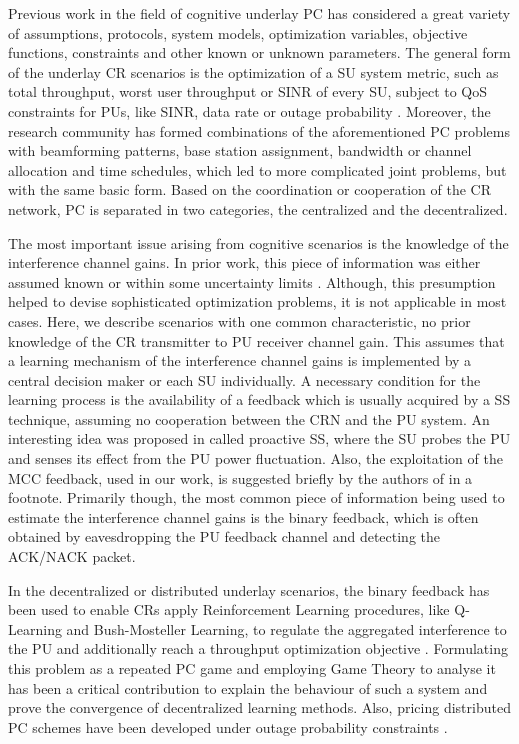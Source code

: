 \documentclass[journal]{IEEEtran}
\begin{document}
Previous work in the field of cognitive underlay PC has considered a great variety of assumptions, protocols, system models, optimization variables, objective functions, constraints and other known or unknown parameters. The general form of the underlay CR scenarios is the optimization of a SU system metric, such as total throughput, worst user throughput or SINR of every SU, subject to QoS constraints for PUs, like SINR, data rate or outage probability \cite{biban82}. Moreover, the research community has formed combinations of the aforementioned PC problems with beamforming patterns, base station assignment, bandwidth or channel allocation and time schedules, which led to more complicated joint problems, but with the same basic form. Based on the coordination or cooperation of the CR network, PC is separated in two categories, the centralized and the decentralized.

The most important issue arising from cognitive scenarios is the knowledge of the interference channel gains. In prior work, this piece of information was either assumed known \cite{biban70} or within some uncertainty limits \cite{biban83, biban64}. Although, this presumption helped to devise sophisticated optimization problems, it is not applicable in most cases. Here, we describe scenarios with one common characteristic, no prior knowledge of the CR transmitter to PU receiver channel gain. This assumes that a learning mechanism of the interference channel gains is implemented by a central decision maker or each SU individually. A necessary condition for the learning process is the availability of a feedback which is usually acquired by a SS technique, assuming no cooperation between the CRN and the PU system. An interesting idea was proposed in \cite{biban81} called proactive SS, where the SU probes the PU and senses its effect from the PU power fluctuation. Also, the exploitation of the MCC feedback, used in our work, is suggested briefly by the authors of \cite{biban81} in a footnote. Primarily though, the most common piece of information being used to estimate the interference channel gains is the binary feedback, which is often obtained by eavesdropping the PU feedback channel and detecting the ACK/NACK packet.

In the decentralized or distributed underlay scenarios, the binary feedback has been used to enable CRs apply Reinforcement Learning procedures, like Q-Learning and Bush-Mosteller Learning, to regulate the aggregated interference to the PU \cite{biban53} and additionally reach a throughput optimization objective \cite{biban52}. Formulating this problem as a repeated PC game and employing Game Theory to analyse it \cite{biban52} has been a critical contribution to explain the behaviour of such a system and prove the convergence of decentralized learning methods. Also, pricing distributed PC schemes have been developed under outage probability constraints \cite{biban50}.
\end{document}
